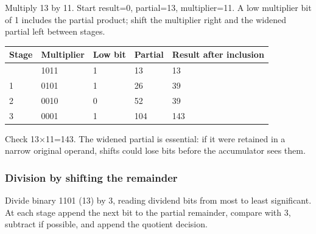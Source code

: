 Multiply 13 by 11. Start result=0, partial=13, multiplier=11. A low multiplier bit of 1 includes the partial product; shift the multiplier right and the widened partial left between stages.

{\def\LTcaptype{none} %
\begin{longtable}[]{@{}lllll@{}}
\toprule\noalign{}
Stage & Multiplier & Low bit & Partial & Result after inclusion \\
\midrule\noalign{}
\endhead
\bottomrule\noalign{}
\endlastfoot
0 & 1011 & 1 & 13 & 13 \\
1 & 0101 & 1 & 26 & 39 \\
2 & 0010 & 0 & 52 & 39 \\
3 & 0001 & 1 & 104 & 143 \\
\end{longtable}
}

Check 13×11=143. The widened partial is essential: if it were retained in a narrow original operand, shifts could lose bits before the accumulator sees them.

\subsubsection{Division by shifting the remainder}\label{appendix-92ff77d4dfdc-division-by-shifting-the-remainder}

\hypertarget{appendix-92ff77d4dfdc-division-by-shifting-the-remainder}{}

Divide binary 1101 (13) by 3, reading dividend bits from most to least significant. At each stage append the next bit to the partial remainder, compare with 3, subtract if possible, and append the quotient decision.

